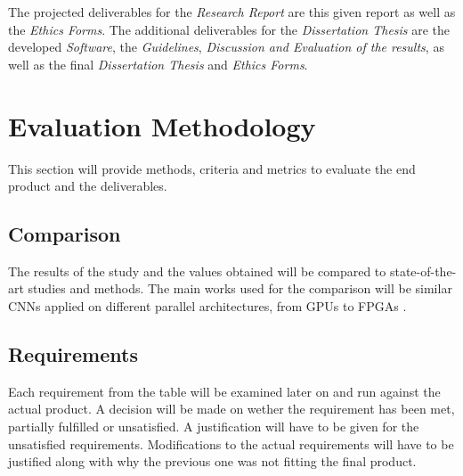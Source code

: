 The projected deliverables for the \emph{Research Report} are this given report as well as the \emph{Ethics Forms}. The additional deliverables for the \emph{Dissertation Thesis} are the developed \emph{Software}, the \emph{Guidelines}, \emph{Discussion and Evaluation of the results}, as well as the final \emph{Dissertation Thesis} and \emph{Ethics Forms}.


\section{Evaluation Methodology}

This section will provide methods, criteria and metrics to evaluate the end product and the deliverables.


\subsection{Comparison}

The results of the study and the values obtained will be compared to state-of-the-art studies and methods. The main works used for the comparison will be similar CNNs applied on different parallel architectures, from GPUs \cite{Micikevicius2017, Jia2018, Kurth2018} to FPGAs \cite{Zhao2016, Colangelo2018, Jahanshahi2019, Bacchus2020}.


\subsection{Requirements}

Each requirement from the table will be examined later on and run against the actual product. A decision will be made on wether the requirement has been met, partially fulfilled or unsatisfied. A justification will have to be given for the unsatisfied requirements. Modifications to the actual requirements will have to be justified along with why the previous one was not fitting the final product.

